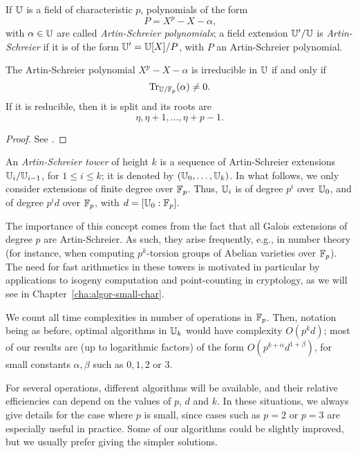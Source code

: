 If $\mathbb{U}$ is a field of characteristic $p$, polynomials of the form
\begin{equation}
  \label{eq:36}
  P=X^p - X - \alpha
  \text{,}  
\end{equation}
with $\alpha \in \mathbb{U}$ are called {\em Artin-Schreier polynomials}; a
field extension $\mathbb{U}'/\mathbb{U}$ is {\em Artin-Schreier} if it is of the form
$\mathbb{U}' = \mathbb{U}[X]/P$, with $P$ an Artin-Schreier polynomial.

\begin{theorem}
  \label{th:artin-schreier}
  The Artin-Schreier polynomial $X^p-X-\alpha$ is irreducible in $\mathbb{U}$
  if and only if
  \begin{equation}
    \label{eq:62}
    \operatorname{Tr}_{\mathbb{U}/\mathbb{F}_p}(\alpha) \ne 0
    \text{.}
  \end{equation}
  If it is reducible, then it is split and its roots are 
  \begin{equation}
    \label{eq:63}
    \eta, \eta+1, \ldots, \eta + p -1
    \text{.}
  \end{equation}
\end{theorem}
\begin{proof}
  See \cite[Theorem~2.25]{lidl+niederreiter:2}.
\end{proof}

An {\em Artin-Schreier tower} of height $k$ is a sequence of
Artin-Schreier extensions $\mathbb{U}_i / \mathbb{U}_{i-1}$, for $1\le i \le k$; it is
denoted by $(\mathbb{U}_0, \ldots, \mathbb{U}_k)$. In what follows, we only consider
extensions of finite degree over $\mathbb{F}_p$. Thus, $\mathbb{U}_i$ is of degree
$p^i$ over $\mathbb{U}_0$, and of degree $p^id$ over $\mathbb{F}_p$, with
$d=[\mathbb{U}_0:\mathbb{F}_p]$.

The importance of this concept comes from the fact that all Galois
extensions of degree $p$ are Artin-Schreier. As such, they arise
frequently, e.g., in number theory (for instance, when computing
$p^k$-torsion groups of Abelian varieties over $\mathbb{F}_p$). The need for
fast arithmetics in these towers is motivated in particular by
applications to isogeny computation and point-counting in cryptology,
as we will see in Chapter~\ref{cha:algor-small-char}.

We count all time complexities in number of operations in
$\mathbb{F}_p$. Then, notation being as before, optimal algorithms in $\mathbb{U}_k$
would have complexity $O(p^kd)$; most of our results are (up to
logarithmic factors) of the form $O(p^{k+\alpha} d^{1+\beta})$, for
small constants $\alpha,\beta$ such as $0,1,2$ or $3$.

For several operations, different algorithms will be available, and
their relative efficiencies can depend on the values of $p$, $d$ and
$k$. In these situations, we always give details for the case where
$p$ is small, since cases such as $p=2$ or $p=3$ are especially useful
in practice. Some of our algorithms could be slightly
improved, but we usually prefer giving the simpler solutions.




%
